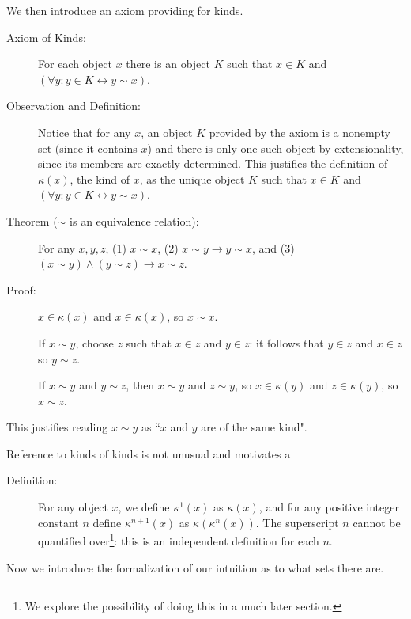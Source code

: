 \documentclass[12pt]{article}
\begin{document}
We then introduce an axiom providing for kinds.

\begin{description}

\item[Axiom of Kinds:]  For each object $x$ there is an object $K$ such that $x \in K$ and $(\forall y:y \in K \leftrightarrow y \sim x)$.

\item[Observation and Definition:]  Notice that for any $x$, an object $K$ provided by the axiom is a nonempty set (since it contains $x$)
and there is only one such object by extensionality, since its members are exactly determined.  This justifies the definition of $\kappa(x)$, the kind of $x$, as the unique object $K$ such that $x \in K$ and $(\forall y:y \in K \leftrightarrow y \sim x)$.

\item[Theorem ($\sim$ is an equivalence relation):]  For any $x,y,z$, (1) $x \sim x$, \newline (2) $x \sim y \rightarrow y \sim x$, and (3) $(x \sim y) \wedge (y \sim z) \rightarrow x \sim z$.

\item[Proof:]  $x \in \kappa(x)$ and $x \in \kappa(x)$, so $x \sim x$.

If $x \sim y$, choose $z$ such that $x \in z$ and $y \in z$:  it follows that $y \in z$ and $x \in z$ so $y \sim z$.

If $x \sim y$ and $y \sim z$, then $x \sim y$ and $z \sim y$, so $x \in \kappa(y)$ and $z \in \kappa(y)$, so $x \sim z$.

\end{description}

This justifies reading $x \sim y$ as ``$x$ and $y$ are of the same kind".

Reference to kinds of kinds is not unusual and motivates a
\begin{description}

\item[Definition:]  For any object $x$, we define $\kappa^1(x)$ as $\kappa(x)$,
and for any positive integer constant $n$ define $\kappa^{n+1}(x)$ as $\kappa(\kappa^n(x))$.  The superscript $n$ cannot be quantified over\footnote{We explore the possibility of doing this in a much later section.}:  this is an independent definition for each $n$.

\end{description}

Now we introduce the formalization of our intuition as to what sets there are.
\end{document}

